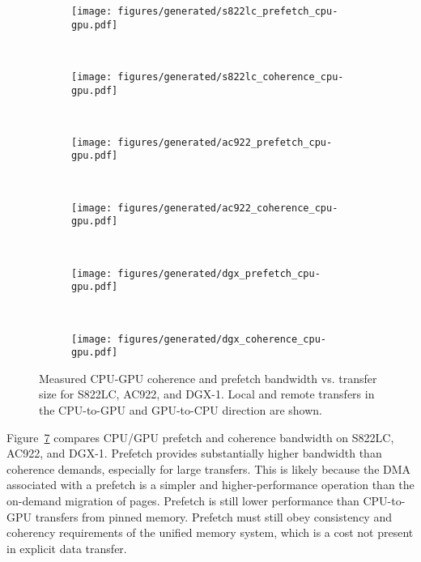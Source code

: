 \begin{figure}[H]
	\centering
	\begin{subfigure}[b]{0.45\textwidth}
		\texttt{[image: figures/generated/s822lc\_prefetch\_cpu-gpu.pdf]}
		\caption{}
		\label{fig:um-prefetch-s822lc-cpu-gpu}
	\end{subfigure}
	~
	\begin{subfigure}[b]{0.45\textwidth}
		\texttt{[image: figures/generated/s822lc\_coherence\_cpu-gpu.pdf]}
		\caption{}
		\label{fig:um-coherence-s822lc-cpu-gpu}
	\end{subfigure}
	\\
	\begin{subfigure}[b]{0.45\textwidth}
		\texttt{[image: figures/generated/ac922\_prefetch\_cpu-gpu.pdf]}
		\caption{}
		\label{fig:um-prefetch-ac922-cpu-gpu}
	\end{subfigure}
	~
	\begin{subfigure}[b]{0.45\textwidth}
		\texttt{[image: figures/generated/ac922\_coherence\_cpu-gpu.pdf]}
		\caption{}
		\label{fig:um-coherence-ac922-cpu-gpu}
	\end{subfigure}
	\\
	\begin{subfigure}[b]{0.45\textwidth}
		\texttt{[image: figures/generated/dgx\_prefetch\_cpu-gpu.pdf]}
		\caption{}
		\label{fig:um-prefetch-dgx-cpu-gpu}
	\end{subfigure}
	~
	\begin{subfigure}[b]{0.45\textwidth}
		\texttt{[image: figures/generated/dgx\_coherence\_cpu-gpu.pdf]}
		\caption{}
		\label{fig:um-coherence-dgx-cpu-gpu}
	\end{subfigure}
	\caption[CPU/GPU coherence and prefetch bandwidth]{
		Measured CPU-GPU coherence and prefetch bandwidth vs. transfer size  for S822LC, AC922, and DGX-1.
		Local and remote transfers in the CPU-to-GPU and GPU-to-CPU direction are shown.
	}
	\label{fig:um-cpu-gpu}
\end{figure}

Figure~\ref{fig:um-cpu-gpu} compares CPU/GPU prefetch and coherence bandwidth on S822LC, AC922, and DGX-1.
Prefetch provides substantially higher bandwidth than coherence demands, especially for large transfers.
This is likely because the DMA associated with a prefetch is a simpler and higher-performance operation than the on-demand migration of pages.
Prefetch is still lower performance than CPU-to-GPU transfers from pinned memory.
Prefetch must still obey consistency and coherency requirements of the unified memory system, which is a cost not present in explicit data transfer.

